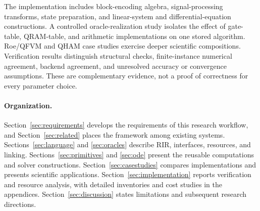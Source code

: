The implementation includes block-encoding algebra, signal-processing
transforms, state preparation, and linear-system and differential-equation
constructions. A controlled oracle-realization study isolates the effect
of gate-table, QRAM-table, and arithmetic implementations on one stored
algorithm. Roe/QFVM and QHAM case studies exercise deeper scientific
compositions. Verification results distinguish structural checks,
finite-instance numerical agreement, backend agreement, and unresolved
accuracy or convergence assumptions. These are complementary evidence,
not a proof of correctness for every parameter choice.

\paragraph{Organization.}
Section~\ref{sec:requirements} develops the requirements of this research
workflow, and Section~\ref{sec:related} places the framework among existing
systems. Sections~\ref{sec:language} and \ref{sec:oracles} describe RIR,
interfaces, resources, and linking. Sections~\ref{sec:primitives} and
\ref{sec:ode} present the reusable computations and solver constructions.
Section~\ref{sec:casestudies} compares implementations and presents
scientific applications. Section~\ref{sec:implementation} reports
verification and resource analysis, with detailed inventories and cost
studies in the appendices. Section~\ref{sec:discussion} states limitations
and subsequent research directions.
